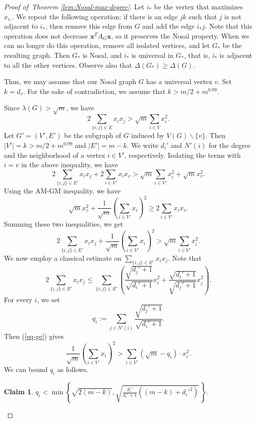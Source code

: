 \documentclass[10pt,a4paper]{amsart}
\newtheorem{claim}{Claim}
\begin{document}
\begin{proof}[Proof of~Theorem \ref{lem:Nosal-max-degree}]
Let $i_*$ be the vertex that maximizes $x_{i_*}$. We repeat the following operation: if there is an edge $jk$ such that $j$ is not adjacent to $i_*$, then remove this edge from $G$ and add the edge $i_* j$. Note that this operation does not decrease $\bm{x}^T A_G \bm{x}$, so it preserves the Nosal property. When we can no longer do this operation, remove all isolated vertices, and let $G_*$ be the resulting graph. Then $G_*$ is Nosal, and $i_*$ is universal in $G_*$, that is, $i_*$ is adjacent to all the other vertices. Observe also that $\Delta(G_*) \geq \Delta(G)$. 

Thus, we may assume that our Nosal graph $G$ has a universal vertex $v$. Set $k = d_v$. For the sake of contradiction, 
we assume that $k > m/2 + m^{0.99}$.

Since $\lambda(G) > \sqrt{m}$, we have
$$ 2\sum_{\{i,j\} \in E} x_i x_j > \sqrt{m} 
\sum_{i \in V} x_i^2.$$
Let $G' = (V', E')$ be the subgraph of $G$ induced by 
$V(G) \backslash \{v\}$. 
Then $|V'|=k > m/2 +m^{0.99}$ and 
$|E'|=m-k$. 
We write $d_i'$ and $N'(i)$ for the degree and the neighborhood of a vertex $i\in V'$, respectively. 
Isolating the terms with $i = v$ in the above inequality, we have
$$2 \sum_{\{i,j\} \in E'} x_i x_j + 
2 \sum_{i \in V'} x_i x_v
> \sqrt{m} \sum_{i \in V'} x_i^2 + \sqrt{m} x_v^2.$$
Using the AM-GM inequality, we have
$$\sqrt{m} x_v^2 + \frac{1}{\sqrt{m}} 
\left( \sum_{i\in V'} x_i \right)^2 
\ge 2\sum_{i\in V'} x_i x_v.$$
Summing these two inequalities, we get 
\begin{equation} \label{eq-ge}
 2\sum_{\{i,j\} \in E'} x_i x_j + 
\frac{1}{\sqrt{m}} \left(\sum_{i \in V'} x_i \right)^2 
> \sqrt{m} \sum_{i \in V'} x_i^2. 
\end{equation} 
We now employ a classical estimate on 
$\sum_{\{i,j\} \in E'} x_i x_j$. Note that
$$ 2 \sum_{\{i,j\} \in E'} x_i x_j 
\leq \sum_{\{i,j\} \in E'} 
\left( \frac{\sqrt{d_j' + 1}}{\sqrt{d_i' + 1}} x_i^2 + \frac{\sqrt{d_i' + 1}}{\sqrt{d_j' + 1}} x_j^2\right).$$
For every $i$, we set
$$q_i := \sum_{j\in N'(i)} \frac{\sqrt{d_j' + 1}}{\sqrt{d_i' + 1}}.$$  
Then (\ref{eq-ge}) gives 
\begin{equation} \label{eq-recall}
\frac{1}{\sqrt{m}} \left(\sum_{i \in V'} x_i\right)^2 > 
\sum_{i \in V'} (\sqrt{m} - q_i ) \cdot x_i^2.
\end{equation}
We can bound $q_i$ as follows.

\begin{claim}\label{cl:1}
$q_i < \min\left\{ 
\sqrt{2(m - k)}, \sqrt{ \frac{d_i'}{d_i' + 1} \left((m - k) + d_i'^2\right)} \, \right\}.$   
\end{claim}



\end{proof}
\end{document}
